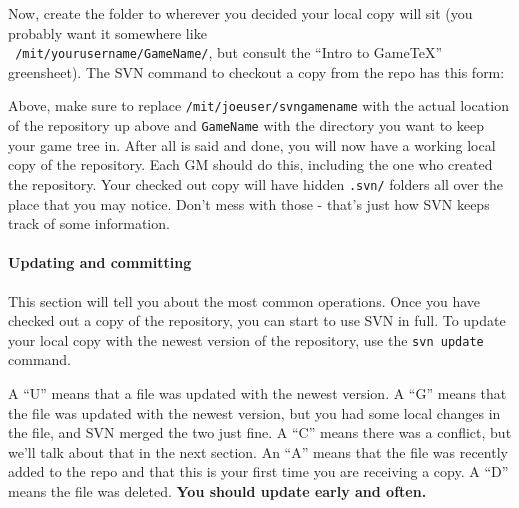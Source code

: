 \documentclass[green]{testgame}
\begin{document}

Now, create the folder to wherever you decided your local copy will
sit (you probably want it somewhere like\\ {\tt
/mit/yourusername/GameName/}, but consult the ``Intro to GameTeX''
greensheet). The SVN command to checkout a copy from the repo has this
form:


Above, make sure to replace {\tt /mit/joeuser/svngamename} with the
actual location of the repository up above and {\tt GameName} with the
directory you want to keep your game tree in. After all is said and
done, you will now have a working local copy of the repository. Each
GM should do this, including the one who created the repository. Your
checked out copy will have hidden {\tt .svn/} folders all over the
place that you may notice. Don't mess with those - that's just how SVN
keeps track of some information.

\paragraph*{Updating and committing}

This section will tell you about the most common operations. Once you
have checked out a copy of the repository, you can start to use SVN in
full. To update your local copy with the newest version of the
repository, use the {\tt svn update} command.


A ``U'' means that a file was updated with the newest version. A ``G''
means that the file was updated with the newest version, but you had
some local changes in the file, and SVN merged the two just fine.  A
``C'' means there was a conflict, but we'll talk about that in the
next section. An ``A'' means that the file was recently added to the
repo and that this is your first time you are receiving a copy. A
``D'' means the file was deleted. {\bf You should update early and
often.}
\end{document}
